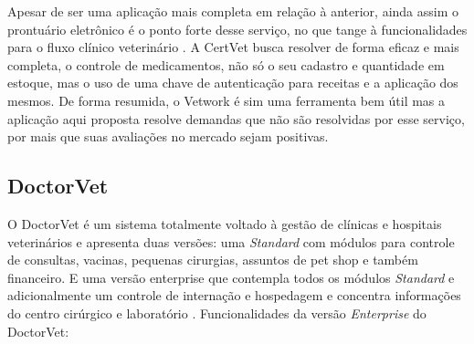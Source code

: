 \documentclass[
    12pt,               %
    openright,          %
    oneside,
    a4paper,            %
    BIBLATEX,           %
    TODO,               %
    english,            %
    brazil              %
    ]{ifsp-spo-inf-ctds}
\begin{document}
    Apesar de ser uma aplicação mais completa em relação à anterior, ainda assim o prontuário eletrônico é o ponto forte desse serviço, no que tange à funcionalidades para o fluxo clínico veterinário . A CertVet busca resolver de forma eficaz e mais completa, o controle de medicamentos, não só o seu cadastro e quantidade em estoque, mas o uso de uma chave de autenticação para receitas e a aplicação dos mesmos. De forma resumida, o Vetwork é sim uma ferramenta bem útil mas a aplicação aqui proposta resolve demandas que não são resolvidas por esse serviço, por mais que suas avaliações no mercado sejam positivas.

        \subsection{DoctorVet}
        O DoctorVet é um sistema totalmente voltado à gestão de clínicas e hospitais veterinários e apresenta duas versões: uma \emph{Standard} com módulos para controle de consultas, vacinas, pequenas cirurgias, assuntos de pet shop e também financeiro. E uma versão enterprise que contempla todos os módulos \emph{Standard} e adicionalmente um controle de internação e hospedagem e concentra informações do centro cirúrgico e laboratório .  Funcionalidades da versão \emph{Enterprise} do DoctorVet:
\end{document}

